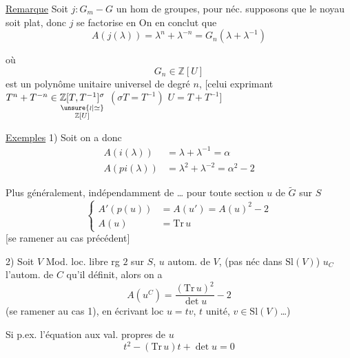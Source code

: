 \uline{Remarque} Soit $j:G_m\mathbin{-}G$ un hom de groupes, pour néc.   supposons que le noyau soit plat, donc $j$ se factorise en
On en conclut que
\[
A(j(\lambda))=\lambda^n+\lambda^{-n}=G_n(\lambda+\lambda^{-1})
\]

où
\[
G_n\in\mathbb Z[U]
\]
est un polynôme unitaire universel de degré $n$, [celui exprimant $T^n+T^{-n}\in\underset{\substack{\unsure{\wr|\simeq}\\\mathbb Z[U]}}{\mathbb Z[T,T^{-1}]^\sigma}$ $(\sigma T=T^{-1})$  $U=T+T^{-1}$]

\uline{Exemples} 1) Soit
on a donc
\[
\begin{aligned}
A(i(\lambda))&=\lambda+\lambda^{-1}=\alpha\\
A(pi(\lambda))&=\lambda^2+\lambda^{-2}=\alpha^2-2
\end{aligned}
\]

Plus généralement, indépendamment de   \ldots{} pour  toute section $u$ de $\widetilde G$ sur $S$
\[
\left\{\begin{aligned}
A'(p(u))&=A(u')=A(u)^2-2\\
A(u)&=\mathrm{Tr}\,u
\end{aligned}\right.
\]
[se ramener au cas précédent]

2) Soit $V$ Mod. loc. libre rg $2$ sur $S$,  $u$ autom. de $V$, \unsure{:|;|,}  (pas néc dans $\mathrm{Sl}(V)$) $u_C$ l'autom. de $C$ qu'il définit, alors on a
\[
A(u^C)=\frac{(\mathrm{Tr}\,u)^2}{\det u}-2
\]
(se ramener au cas 1), en écrivant loc $u=tv$, $t$ unité, $v\in\mathrm{Sl}(V)$\ldots)

Si p.ex. l'équation aux val. propres de $u$
\[
t^2-(\mathrm{Tr}\,u)t+\det u=0
\]
